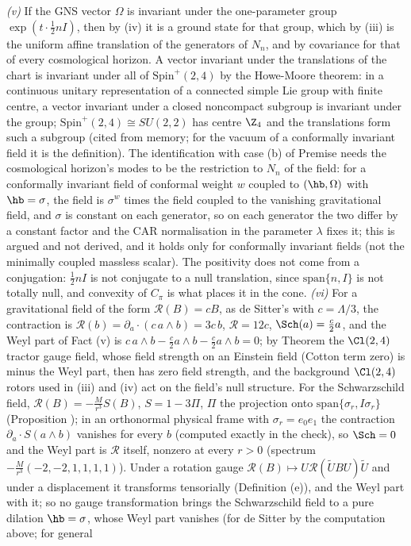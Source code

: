 \emph{(v)} If the GNS vector $\Omega$ is invariant under the one-parameter group $\exp(t\cdot\tfrac12 nI)$, then by (iv) it is a ground state for that group, which by (iii) is the uniform affine translation of the generators of $N_{n}$, and by covariance for that of every cosmological horizon. A vector invariant under the translations of the chart is invariant under all of $\mathrm{Spin}^{+}(2,4)$ by the Howe-Moore theorem: in a continuous unitary representation of a connected simple Lie group with finite centre, a vector invariant under a closed noncompact subgroup is invariant under the group; $\mathrm{Spin}^{+}(2,4) \cong SU(2,2)$ has centre $\Z_{4}$ and the translations form such a subgroup (cited from memory; for the vacuum of a conformally invariant field it is the definition). The identification with case (b) of Premise  needs the cosmological horizon's modes to be the restriction to $N_{n}$ of the field: for a conformally invariant field of conformal weight $w$ coupled to $(\hb, \Omega)$ with $\hb = \sigma$, the field is $\sigma^{w}$ times the field coupled to the vanishing gravitational field, and $\sigma$ is constant on each generator, so on each generator the two differ by a constant factor and the CAR normalisation in the parameter $\lambda$ fixes it; this is argued and not derived, and it holds only for conformally invariant fields (not the minimally coupled massless scalar). The positivity does not come from a conjugation: $\tfrac12 nI$ is not conjugate to a null translation, since $\mathrm{span}\{n, I\}$ is not totally null, and convexity of $C_{\pi}$ is what places it in the cone. \emph{(vi)} For a gravitational field of the form $\mathcal{R}(B) = cB$, as de Sitter's with $c = \Lambda/3$, the contraction is $\mathcal{R}(b) = \partial_{a}\cdot(c\,a \wedge b) = 3c\,b$, $\mathcal{R} = 12c$, $\Sch(a) = \tfrac{c}{2}a$, and the Weyl part of Fact (v) is $c\,a \wedge b - \tfrac{c}{2}a \wedge b - \tfrac{c}{2}a \wedge b = 0$; by Theorem  the $\Cl(2,4)$ tractor gauge field, whose field strength on an Einstein field (Cotton term zero) is minus the Weyl part, then has zero field strength, and the background $\Cl(2,4)$ rotors used in (iii) and (iv) act on the field's null structure. For the Schwarzschild field, $\mathcal{R}(B) = -\tfrac{M}{r^{3}}S(B)$, $S = 1 - 3\Pi$, $\Pi$ the projection onto $\mathrm{span}\{\sigma_{r}, I\sigma_{r}\}$ (Proposition ); in an orthonormal physical frame with $\sigma_{r} = e_{0}e_{1}$ the contraction $\partial_{a}\cdot S(a \wedge b)$ vanishes for every $b$ (computed exactly in the check), so $\Sch = 0$ and the Weyl part is $\mathcal{R}$ itself, nonzero at every $r > 0$ (spectrum $-\tfrac{M}{r^{3}}(-2, -2, 1, 1, 1, 1)$). Under a rotation gauge $\mathcal{R}(B) \mapsto U\mathcal{R}(\tilde UBU)\tilde U$ and under a displacement it transforms tensorially (Definition (e)), and the Weyl part with it; so no gauge transformation brings the Schwarzschild field to a pure dilation $\hb = \sigma$, whose Weyl part vanishes (for de Sitter by the computation above; for general 